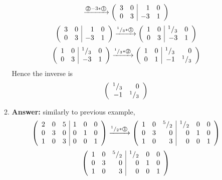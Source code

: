 \documentclass[8pt]{article} %
\begin{document}
\begin{enumerate}[1]
\begin{enumerate}[\bf(a)]
\[				\xrightarrow{\text{\textcircled{2}$-3*$\textcircled{1}}}\left(\begin{array}{rr|rr}
					3&0&1&0\\
					0&3&-3&1\\
				\end{array}\right)
				\]\[\left(\begin{array}{rr|rr}
					3&0&1&0\\
					0&3&-3&1\\
				\end{array}\right)
				\xrightarrow{\text{${^{1}/_{3}}*$\textcircled{1}}}\left(\begin{array}{rr|rr}
					1&0&{^{1}/_{3}}&0\\
					0&3&-3&1\\
				\end{array}\right)
				\]\[\left(\begin{array}{rr|rr}
					1&0&{^{1}/_{3}}&0\\
					0&3&-3&1\\
				\end{array}\right)
				\xrightarrow{\text{${^{1}/_{3}}*$\textcircled{2}}}\left(\begin{array}{rr|rr}
					1&0&{^{1}/_{3}}&0\\
					0&1&-1&{^{1}/_{3}}\\
				\end{array}\right)
				\]
				Hence the inverse is \[\left(\begin{array}{rr}{^{1}/_{3}}&0\\-1&{^{1}/_{3}}\end{array}\right)\]
			\setcounter{enumi}{5}
		\item {\bf Answer: }similarly to previous example,
\[\left(\begin{array}{rrr|rrr}
2&0&5&1&0&0\\
0&3&0&0&1&0\\
1&0&3&0&0&1\\
\end{array}\right)
\xrightarrow{\text{${^{1}/_{2}}*$\textcircled{1}}}\left(\begin{array}{rrr|rrr}
1&0&{^{5}/_{2}}&{^{1}/_{2}}&0&0\\
0&3&0&0&1&0\\
1&0&3&0&0&1\\
\end{array}\right)
\]\[\left(\begin{array}{rrr|rrr}
1&0&{^{5}/_{2}}&{^{1}/_{2}}&0&0\\
0&3&0&0&1&0\\
1&0&3&0&0&1\\
\end{array}\right)
\]
\end{enumerate}
\end{enumerate}
\end{document}
